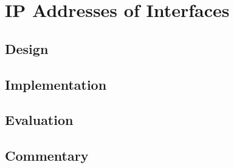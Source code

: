 \section{IP Addresses of Interfaces}
\label{sec:IP}

\subsection{Design}

\subsection{Implementation}

\subsection{Evaluation}

\subsection{Commentary}

